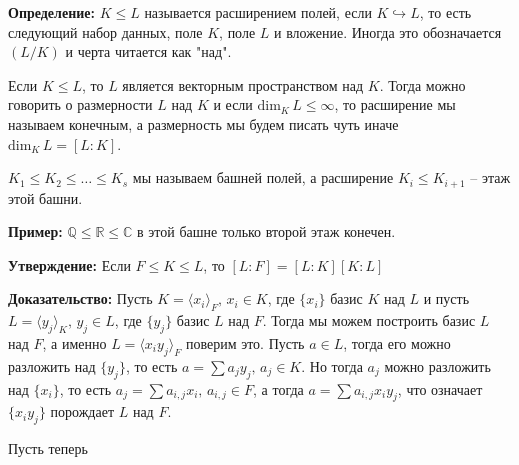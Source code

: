 \documentclass[a4paper, 12pt]{book}
\begin{document}
\textbf{Определение:} $K\leq L$ называется расширением полей, если $K
\hookrightarrow L$, то есть следующий набор данных, поле $K$, поле $L$ и
вложение. Иногда это обозначается $(L/K)$ и черта читается как "над".

Если $K\leq L$, то $L$ является векторным пространством над $K$. Тогда можно
говорить о размерности $L$ над $K$ и если $\text{dim}_K\,L\le\infty$, то
расширение мы называем конечным, а размерность мы будем писать чуть иначе
$\text{dim}_K\,L=[L:K]$.

$K_1\le K_2\le\ldots\le K_s$ мы называем башней полей, а расширение $K_i\le
K_{i+1}$ – этаж этой башни.

\textbf{Пример:} $\mathbb{Q}\le\mathbb{R}\le\mathbb{C}$ в этой башне только
второй этаж конечен.

\textbf{Утверждение:} Если $F\le K\le L$, то $[L:F]=[L:K][K:L]$

\textbf{Доказательство:} Пусть $K=\langle x_i\rangle_F,\,x_i\in K$, где
$\{x_i\}$ базис $K$ над $L$ и пусть $L=\langle y_j\rangle_K,\,y_j\in L$, где
$\{y_j\}$ базис $L$ над $F$. Тогда мы можем построить базис $L$ над $F$, а
именно $L=\langle x_iy_j \rangle_F$ поверим это. Пусть $a\in L$, тогда его
можно разложить над $\{y_j\}$, то есть $a=\sum a_jy_j,\,a_j\in K$. Но тогда
$a_j$ можно разложить над $\{x_i\}$, то есть $a_j=\sum a_{i,j}x_i,\,a_{i,j}\in
F$, а тогда $a=\sum a_{i,j}x_iy_j$, что означает $\{x_iy_j\}$ порождает $L$ над
$F$.

Пусть теперь 
\end{document}
